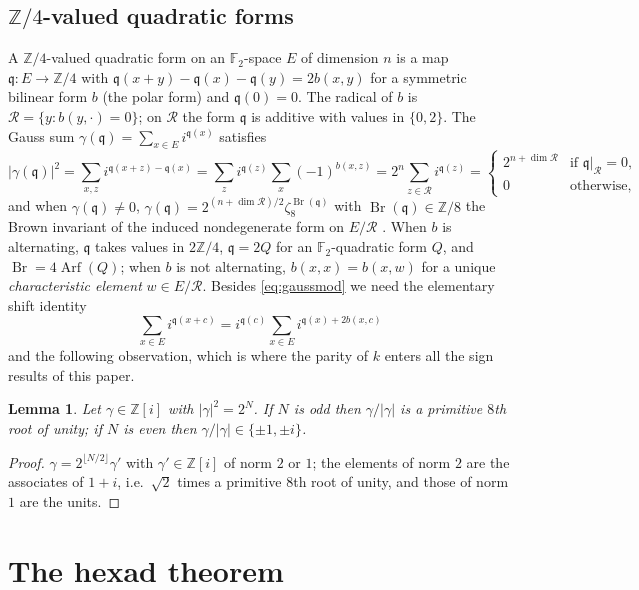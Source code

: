 ﻿\documentclass[12pt,a4paper]{amsart}
\newtheorem{lemma}[theorem]{Lemma}
\theoremstyle{definition}
\newcommand{\F}{\mathbb{F}}
\newcommand{\Z}{\mathbb{Z}}
\newcommand{\Arf}{\operatorname{Arf}}
\newcommand{\Br}{\operatorname{Br}}
\newcommand{\Rr}{\mathcal{R}}
\newcommand{\qq}{\mathfrak{q}}
\begin{document}
\subsection{\texorpdfstring{$\Z/4$}{Z/4}-valued quadratic forms}\label{subsec:Z4}
A $\Z/4$-valued quadratic form on an $\F_2$-space $E$ of dimension $n$ is a map $\qq:E\to\Z/4$ with $\qq(x+y)-\qq(x)-\qq(y)=2b(x,y)$ for a symmetric bilinear form $b$ (the polar form) and $\qq(0)=0$. The radical of $b$ is $\Rr=\{y:b(y,\cdot)=0\}$; on $\Rr$ the form $\qq$ is additive with values in $\{0,2\}$. The Gauss sum $\gamma(\qq)=\sum_{x\in E}i^{\qq(x)}$ satisfies
\begin{equation}\label{eq:gaussmod}
|\gamma(\qq)|^2=\sum_{x,z}i^{\qq(x+z)-\qq(x)}=\sum_zi^{\qq(z)}\sum_x(-1)^{b(x,z)}=2^n\sum_{z\in\Rr}i^{\qq(z)}=
\begin{cases}2^{n+\dim\Rr}&\text{if }\qq|_\Rr=0,\\0&\text{otherwise,}\end{cases}
\end{equation}
and when $\gamma(\qq)\ne0$, $\gamma(\qq)=2^{(n+\dim\Rr)/2}\zeta_8^{\Br(\qq)}$ with $\Br(\qq)\in\Z/8$ the Brown invariant of the induced nondegenerate form on $E/\Rr$ \cite{Brown}. When $b$ is alternating, $\qq$ takes values in $2\Z/4$, $\qq=2Q$ for an $\F_2$-quadratic form $Q$, and $\Br=4\Arf(Q)$; when $b$ is not alternating, $b(x,x)=b(x,w)$ for a unique \emph{characteristic element} $w\in E/\Rr$. Besides \eqref{eq:gaussmod} we need the elementary shift identity
\begin{equation}\label{eq:shift}
\sum_{x\in E}i^{\qq(x+c)}=i^{\qq(c)}\sum_{x\in E}i^{\qq(x)+2b(x,c)}
\end{equation}
and the following observation, which is where the parity of $k$ enters all the sign results of this paper.

\begin{lemma}\label{lem:oddgauss}
Let $\gamma\in\Z[i]$ with $|\gamma|^2=2^N$. If $N$ is odd then $\gamma/|\gamma|$ is a primitive $8$th root of unity; if $N$ is even then $\gamma/|\gamma|\in\{\pm1,\pm i\}$.
\end{lemma}
\begin{proof}
$\gamma=2^{\lfloor N/2\rfloor}\gamma'$ with $\gamma'\in\Z[i]$ of norm $2$ or $1$; the elements of norm $2$ are the associates of $1+i$, i.e.\ $\sqrt2$ times a primitive $8$th root of unity, and those of norm $1$ are the units.
\end{proof}

\section{The hexad theorem}\label{sec:hexad}
\end{document}
